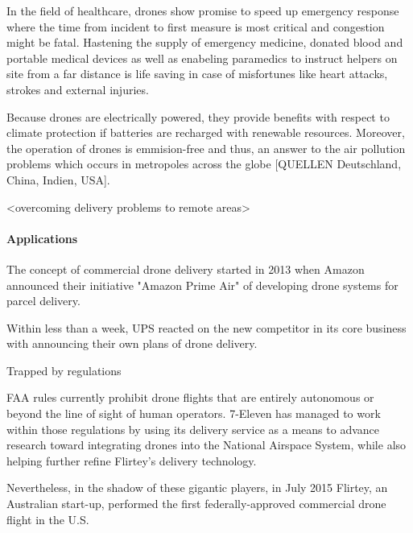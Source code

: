In the field of healthcare,
drones show promise to speed up emergency response
where the time from incident to first measure is 
most critical and 
congestion might be fatal.
Hastening the supply of emergency medicine,
donated blood and portable medical devices as well as
enabeling paramedics to instruct helpers on site from a far distance
is life saving in case of misfortunes like 
heart attacks, strokes and external injuries.

Because drones are electrically powered, they provide benefits
with respect to climate protection if batteries
are recharged with renewable resources. Moreover,
the operation of drones is emmision-free and thus,
an answer to the air pollution problems
which occurs in metropoles across the globe [QUELLEN Deutschland, China, Indien, USA].

<overcoming delivery problems to remote areas>


\paragraph{Applications}

The concept of commercial drone delivery started in 2013
when Amazon announced their initiative "Amazon Prime Air" of developing drone systems for 
parcel delivery.

Within less than a week, UPS reacted on the new competitor in its core business with
announcing their own plans of drone delivery.

Trapped by regulations

FAA rules currently prohibit drone flights 
that are entirely autonomous or 
beyond the line of sight of human operators. 
7-Eleven has managed to work within those regulations
by using its delivery service as a means to advance research 
toward integrating drones into the National Airspace System, 
while also helping further refine Flirtey’s delivery technology.



Nevertheless, in the shadow of these gigantic players,
in July 2015 Flirtey, an Australian start-up, performed the first
federally-approved commercial drone flight in the U.S.

